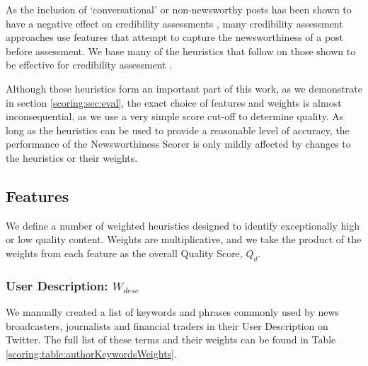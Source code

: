 As the inclusion of `conversational' or non-newsworthy posts has been shown to have a negative effect on credibility assessments \citep{Noyunsan17,Sikdar13-2}, many credibility assessment approaches use features that attempt to capture the newsworthiness of a post before assessment.
We base many of the heuristics that follow on those shown to be effective for credibility assessment \citep{Sikdar13, Kang12, Castillo11, Madhawa15}.



Although these heuristics form an important part of this work, as we demonstrate in section \ref{scoring:sec:eval}, the exact choice of features and weights is almost inconsequential, as we use a very simple score cut-off to determine quality. As long as the heuristics can be used to provide a reasonable level of accuracy, the performance of the Newsworthiness Scorer is only mildly affected by changes to the heuristics or their weights.

\subsection{Features}
We define a number of weighted heuristics designed to identify exceptionally high or low quality content. Weights are multiplicative, and we take the product of the weights from each feature as the overall Quality Score, \(Q_d\).

\subsubsection{User Description: \(W_{desc}\)}
We manually created a list of keywords and phrases commonly used by news broadcasters, journalists and financial traders in their User Description on Twitter. The full list of these terms and their weights can be found in Table \ref{scoring:table:authorKeywordsWeights}.

